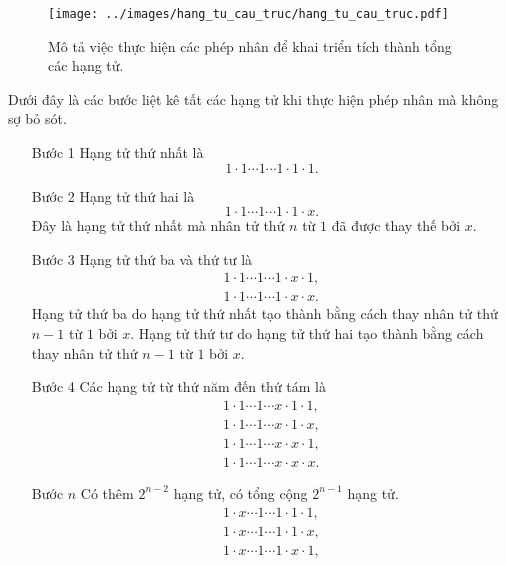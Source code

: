 \documentclass[12pt]{article} %
\begin{document}
    \begin{figure}[h!]
        \centering
        \texttt{[image: ../images/hang\_tu\_cau\_truc/hang\_tu\_cau\_truc.pdf]}
        \caption{Mô tả việc thực hiện các phép nhân để khai triển tích thành tổng các hạng tử.}
    \end{figure}
Dưới đây là các bước liệt kê tất các hạng tử khi thực hiện phép nhân mà không sợ bỏ sót.
    \begin{itemize}
        \item [Bước 1] Hạng tử thứ nhất là 
            \[1 \cdot 1 \cdots 1 \cdots 1 \cdot 1 \cdot 1.\] 
        \item [Bước 2] Hạng tử thứ hai là 
            \[1 \cdot 1 \cdots 1 \cdots 1 \cdot 1 \cdot x.\] 
        Đây là hạng tử thứ nhất mà nhân tử thứ \(n\) từ \(1\) đã được thay thế bởi \(x\).
        \item [Bước 3] Hạng tử thứ ba và thứ tư là 
            \[\begin{matrix}
                1 \cdot 1 \cdots 1 \cdots 1 \cdot x \cdot 1, \\
                1 \cdot 1 \cdots 1 \cdots 1 \cdot x \cdot x.
            \end{matrix}\]
        Hạng tử thứ ba do hạng tử thứ nhất tạo thành bằng cách thay nhân tử thứ \(n-1\) từ \(1\) bởi \(x\). Hạng tử thứ tư do hạng tử thứ hai tạo thành bằng cách thay nhân tử thứ \(n-1\) từ \(1\) bởi \(x\). 
        \item [Bước 4] Các hạng tử từ thứ năm đến thứ tám là
            \[\begin{matrix}
                1 \cdot 1 \cdots 1 \cdots x \cdot 1 \cdot 1, \\
                1 \cdot 1 \cdots 1 \cdots x \cdot 1 \cdot x, \\
                1 \cdot 1 \cdots 1 \cdots x \cdot x \cdot 1, \\
                1 \cdot 1 \cdots 1 \cdots x \cdot x \cdot x.
            \end{matrix}\]
        \item [Bước \(n\)] Có thêm \(2^{n-2}\) hạng tử, có tổng cộng \(2^{n-1}\) hạng tử.
            \[\begin{matrix}
                1 \cdot x \cdots 1 \cdots 1 \cdot 1 \cdot 1, \\
                1 \cdot x \cdots 1 \cdots 1 \cdot 1 \cdot x, \\
                1 \cdot x \cdots 1 \cdots 1 \cdot x \cdot 1, \\

\end{matrix}\]
\end{itemize}
\end{document}
